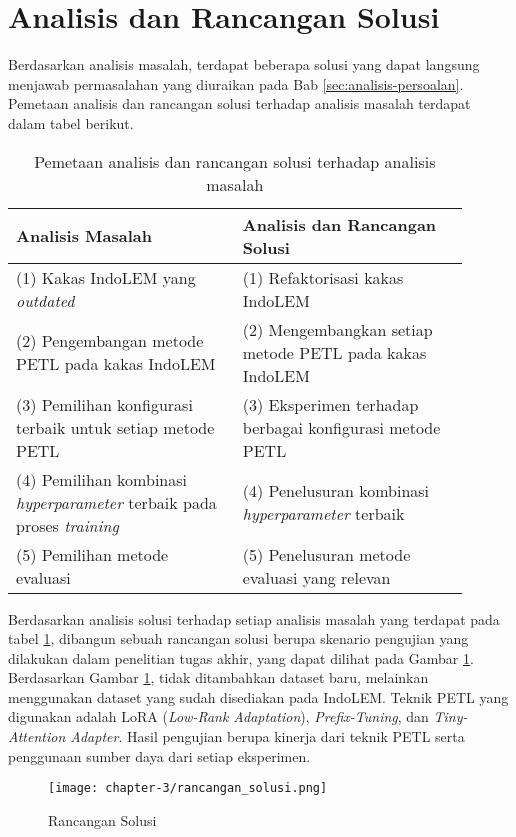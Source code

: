 \section{Analisis dan Rancangan Solusi}

Berdasarkan analisis masalah, terdapat beberapa solusi yang dapat langsung menjawab permasalahan yang diuraikan pada Bab \ref{sec:analisis-persoalan}. Pemetaan analisis dan rancangan solusi terhadap analisis masalah terdapat dalam tabel berikut.

\begin{table}[h!]
    \centering
    \begin{tabular}{|m{0.45\linewidth}|m{0.45\linewidth}|}
    \hline
    \rowcolor{black!10}
    \textbf{Analisis Masalah} & \textbf{Analisis dan Rancangan Solusi} \\ \hline
    (1) Kakas IndoLEM yang \textit{outdated} & (1) Refaktorisasi kakas IndoLEM \\ \hline
    (2) Pengembangan metode PETL pada kakas IndoLEM & (2) Mengembangkan setiap metode PETL pada kakas IndoLEM \\ \hline
    (3) Pemilihan konfigurasi terbaik untuk setiap metode PETL & (3) Eksperimen terhadap berbagai konfigurasi metode PETL \\ \hline
    (4) Pemilihan kombinasi \textit{hyperparameter} terbaik pada proses \textit{training} & (4) Penelusuran kombinasi \textit{hyperparameter} terbaik\\ \hline
    (5) Pemilihan metode evaluasi & (5) Penelusuran metode evaluasi yang relevan \\ \hline
    \end{tabular}
\caption{Pemetaan analisis dan rancangan solusi terhadap analisis masalah}
\label{table:pemetaan-masalah-solusi}
\end{table}

Berdasarkan analisis solusi terhadap setiap analisis masalah yang terdapat pada tabel \ref{table:pemetaan-masalah-solusi}, dibangun sebuah rancangan solusi berupa skenario pengujian yang dilakukan dalam penelitian tugas akhir, yang dapat dilihat pada Gambar \ref{fig:rancangan-solusi}. Berdasarkan Gambar \ref{fig:rancangan-solusi}, tidak ditambahkan dataset baru, melainkan menggunakan dataset yang sudah disediakan pada IndoLEM. Teknik PETL yang digunakan adalah LoRA (\textit{Low-Rank Adaptation}), \textit{Prefix-Tuning}, dan \textit{Tiny-Attention Adapter}. Hasil pengujian berupa kinerja dari teknik PETL serta penggunaan sumber daya dari setiap eksperimen.

\begin{figure}[ht]
    \centering
    \texttt{[image: chapter-3/rancangan\_solusi.png]}
    \caption{Rancangan Solusi}
    \label{fig:rancangan-solusi}
\end{figure}
